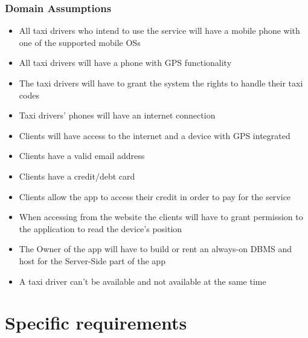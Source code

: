 \documentclass{article}
\begin{document}
\subsubsection{Domain Assumptions}
\begin{itemize}
	\item All taxi drivers who intend to use the service will have a mobile phone with one of the supported mobile OSs
	\item All taxi drivers will have a phone with GPS functionality
	\item The taxi drivers will have to grant the system the rights to handle their taxi codes
	\item Taxi drivers' phones will have an internet connection
	\item Clients will have access to the internet and a device with GPS integrated 
	\item Clients have a valid email address
	\item Clients have a credit/debt card 
	\item Clients allow the app to access their credit in order to pay for the service
	\item When accessing from the website the clients will have to grant permission to the application to read the device's position
	\item The Owner of the app will have to build or rent an always-on DBMS and host for the Server-Side part of the app
	\item A taxi driver can't be available and not available at the same time
\end{itemize}
\clearpage
\section{Specific requirements}
\end{document}
